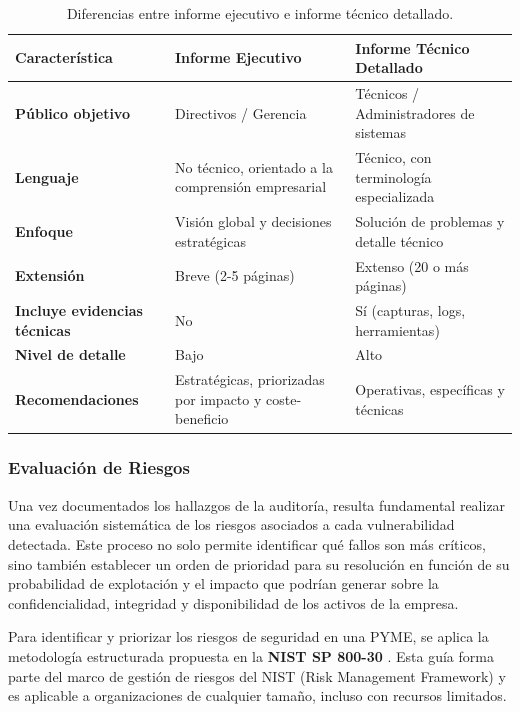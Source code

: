 \documentclass[a4paper, 11pt]{article}
\begin{document}
\begin{table}[H]
\centering
\begin{tabular}{|p{4cm}|p{5cm}|p{5cm}|}
\hline
\textbf{Característica} & \textbf{Informe Ejecutivo} & \textbf{Informe Técnico Detallado} \\
\hline
\textbf{Público objetivo} & Directivos / Gerencia & Técnicos / Administradores de sistemas \\
\hline
\textbf{Lenguaje} & No técnico, orientado a la comprensión empresarial & Técnico, con terminología especializada \\
\hline
\textbf{Enfoque} & Visión global y decisiones estratégicas & Solución de problemas y detalle técnico \\
\hline
\textbf{Extensión} & Breve (2-5 páginas) & Extenso (20 o más páginas) \\
\hline
\textbf{Incluye evidencias técnicas} & No & Sí (capturas, logs, herramientas) \\
\hline
\textbf{Nivel de detalle} & Bajo & Alto \\
\hline
\textbf{Recomendaciones} & Estratégicas, priorizadas por impacto y coste-beneficio & Operativas, específicas y técnicas \\
\hline
\end{tabular}
\caption{Diferencias entre informe ejecutivo e informe técnico detallado.}
\end{table}








\subsubsection{Evaluación de Riesgos}

Una vez documentados los hallazgos de la auditoría, resulta fundamental realizar una evaluación sistemática de los riesgos asociados a 
cada vulnerabilidad detectada. Este proceso no solo permite identificar qué fallos son más críticos, sino también establecer un orden de 
prioridad para su resolución en función de su probabilidad de explotación y el impacto que podrían generar sobre la confidencialidad, 
integridad y disponibilidad de los activos de la empresa.



Para identificar y priorizar los riesgos de seguridad en una PYME, se aplica la metodología estructurada propuesta en la \textbf{NIST SP 800-30} \cite{nist80030}. Esta guía forma parte del marco de gestión de riesgos del NIST (Risk Management Framework) y es aplicable a organizaciones de cualquier tamaño, incluso con recursos limitados.
\end{document}
